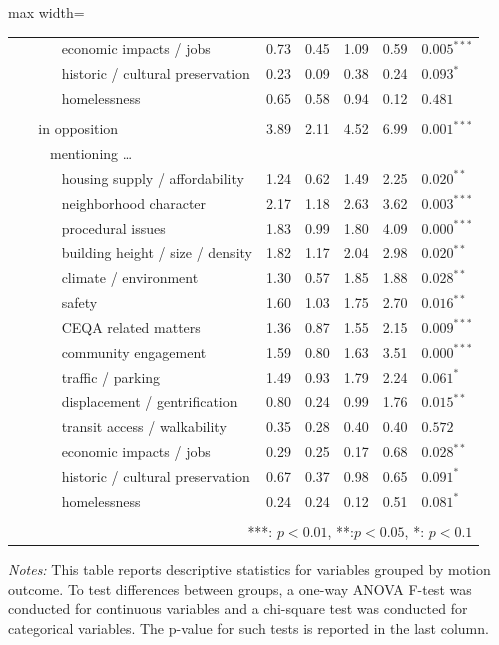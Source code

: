 \begin{table}[H]
\begin{adjustbox}{max width=\textwidth}
\begin{threeparttable}
\begin{tabular}{lrrrrl}
~ ~ ~ ~ economic impacts / jobs & 0.73 & 0.45 & 1.09 & 0.59 & $0.005^{***}$ \\
~ ~ ~ ~ historic / cultural preservation & 0.23 & 0.09 & 0.38 & 0.24 & $0.093^{*}$ \\
~ ~ ~ ~ homelessness & 0.65 & 0.58 & 0.94 & 0.12 & $0.481^{}$ \\
 & & & & & \\
~ ~ in opposition & 3.89 & 2.11 & 4.52 & 6.99 & $0.001^{***}$ \\
~ ~ ~ mentioning \ldots & & & & & \\
~ ~ ~ ~ housing supply / affordability & 1.24 & 0.62 & 1.49 & 2.25 & $0.020^{**}$ \\
~ ~ ~ ~ neighborhood character & 2.17 & 1.18 & 2.63 & 3.62 & $0.003^{***}$ \\
~ ~ ~ ~ procedural issues & 1.83 & 0.99 & 1.80 & 4.09 & $0.000^{***}$ \\
~ ~ ~ ~ building height / size / density & 1.82 & 1.17 & 2.04 & 2.98 & $0.020^{**}$ \\
~ ~ ~ ~ climate / environment & 1.30 & 0.57 & 1.85 & 1.88 & $0.028^{**}$ \\
~ ~ ~ ~ safety & 1.60 & 1.03 & 1.75 & 2.70 & $0.016^{**}$ \\
~ ~ ~ ~ CEQA related matters & 1.36 & 0.87 & 1.55 & 2.15 & $0.009^{***}$ \\
~ ~ ~ ~ community engagement & 1.59 & 0.80 & 1.63 & 3.51 & $0.000^{***}$ \\
~ ~ ~ ~ traffic / parking & 1.49 & 0.93 & 1.79 & 2.24 & $0.061^{*}$ \\
~ ~ ~ ~ displacement / gentrification & 0.80 & 0.24 & 0.99 & 1.76 & $0.015^{**}$ \\
~ ~ ~ ~ transit access / walkability & 0.35 & 0.28 & 0.40 & 0.40 & $0.572^{}$ \\
~ ~ ~ ~ economic impacts / jobs & 0.29 & 0.25 & 0.17 & 0.68 & $0.028^{**}$ \\
~ ~ ~ ~ historic / cultural preservation & 0.67 & 0.37 & 0.98 & 0.65 & $0.091^{*}$ \\
~ ~ ~ ~ homelessness & 0.24 & 0.24 & 0.12 & 0.51 & $0.081^{*}$ \\

 & & & & & \\
\bottomrule
\multicolumn{6}{r}{***: $p < 0.01$, **:$p < 0.05$, *: $p < 0.1$}
\end{tabular}
\begin{tablenotes}
\item {\textit{Notes: } This table reports descriptive statistics for variables grouped by motion outcome. To test differences between groups, a one-way ANOVA F-test was conducted for continuous variables and a chi-square test was conducted for categorical variables. The p-value for such tests is reported in the last column.}
\end{tablenotes}
\end{threeparttable}
\end{adjustbox}
\end{table}
